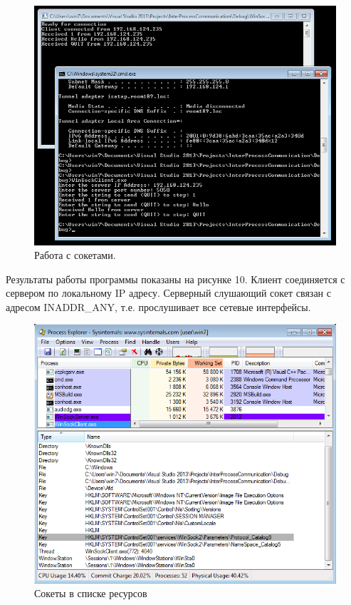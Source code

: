 \documentclass[a4paper, 12pt]{report}		%
\begin{document}


\begin{figure}[h!]
\centering
\includegraphics[scale=0.85]{res/10_Winsock}
\caption{Работа с сокетами.}
\end{figure}

Результаты работы программы показаны на рисунке 10. Клиент соединяется с сервером по локальному IP адресу. Серверный слушающий сокет связан с адресом INADDR\_ANY, т.е. прослушивает все сетевые интерфейсы.

\begin{figure}[h!]
\centering
\includegraphics[scale=1]{res/11_Process_Explorer}
\caption{Сокеты в списке ресурсов}
\end{figure}
\end{document}
